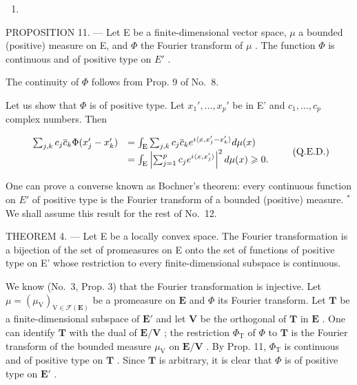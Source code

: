 \begin{enumerate}
\def\labelenumi{(\arabic{enumi})}
\setcounter{enumi}{65}
\tightlist
\item
\end{enumerate}

PROPOSITION 11. --- Let E be a finite-dimensional vector space, \(\mu\) a bounded (positive) measure on E, and \(\Phi\) the Fourier transform of \(\mu\) . The function \(\Phi\) is continuous and of positive type on \(E'\) .

The continuity of \(\Phi\) follows from Prop. 9 of No.~8.

Let us show that \(\Phi\) is of positive type. Let \(x_1', \ldots, x_p'\) be in E' and \(c_1, \ldots, c_p\) complex numbers. Then

\[
\begin{array}{r l} \sum_ {j, k} c _ {j} \overline {{{c}}} _ {k} \Phi (x _ {j} ^ {\prime} - x _ {k} ^ {\prime}) & = \int_ {\mathrm{E}} \sum_ {j, k} c _ {j} \overline {{{c}}} _ {k} e ^ {i \langle x, x _ {j} ^ {\prime} - x _ {k} ^ {\prime} \rangle} d \mu (x) \\ & = \int_ {\mathrm{E}} \left| \sum_ {j = 1} ^ {p} c _ {j} e ^ {i \langle x, x _ {j} ^ {\prime} \rangle} \right| ^ {2} d \mu (x) \geqslant 0. \end{array}\tag{Q.E.D.}
\]

One can prove a converse known as Bochner's theorem: every continuous function on \(E'\) of positive type is the Fourier transform of a bounded (positive) measure. \(^{*}\) We shall assume this result for the rest of No.~12.

THEOREM 4. --- Let E be a locally convex space. The Fourier transformation is a bijection of the set of promeasures on E onto the set of functions of positive type on E' whose restriction to every finite-dimensional subspace is continuous.

We know (No.~3, Prop. 3) that the Fourier transformation is injective. Let \(\mu = (\mu_{\mathrm{V}})_{\mathrm{V}\in \mathcal{F}(\mathbf{E})}\) be a promeasure on \(\mathbf{E}\) and \(\Phi\) its Fourier transform. Let \(\mathbf{T}\) be a finite-dimensional subspace of \(\mathbf{E}'\) and let \(\mathbf{V}\) be the orthogonal of \(\mathbf{T}\) in \(\mathbf{E}\) . One can identify \(\mathbf{T}\) with the dual of \(\mathbf{E} / \mathbf{V}\) ; the restriction \(\Phi_{\mathrm{T}}\) of \(\Phi\) to \(\mathbf{T}\) is the Fourier transform of the bounded measure \(\mu_{\mathrm{V}}\) on \(\mathbf{E} / \mathbf{V}\) . By Prop. 11, \(\Phi_{\mathrm{T}}\) is continuous and of positive type on \(\mathbf{T}\) . Since \(\mathbf{T}\) is arbitrary, it is clear that \(\Phi\) is of positive type on \(\mathbf{E}'\) .

